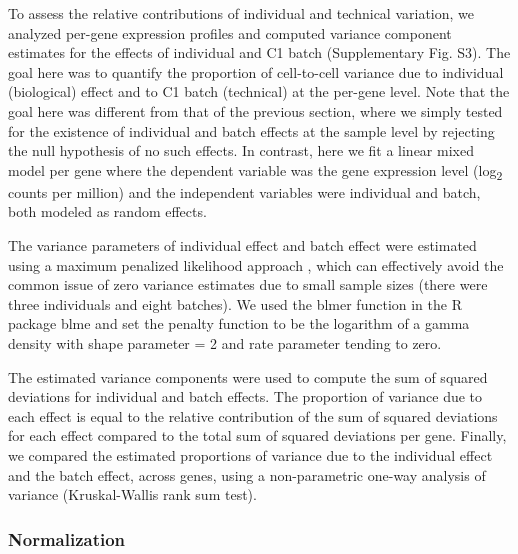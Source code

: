 To assess the relative contributions of individual and technical
variation, we analyzed per-gene expression profiles and computed
variance component estimates for the effects of individual and C1 batch
(Supplementary Fig. S3). The goal here was to quantify the proportion of
cell-to-cell variance due to individual (biological) effect and to C1
batch (technical) at the per-gene level. Note that the goal here was
different from that of the previous section, where we simply tested for
the existence of individual and batch effects at the sample level by
rejecting the null hypothesis of no such effects. In contrast, here we
fit a linear mixed model per gene where the dependent variable was the
gene expression level (log\textsubscript{2} counts per million) and the
independent variables were individual and batch, both modeled as random
effects.

The variance parameters of individual effect and batch effect were
estimated using a maximum penalized likelihood approach
\citep{Chung2013}, which can effectively avoid the common issue of zero
variance estimates due to small sample sizes (there were three
individuals and eight batches). We used the blmer function in the R
package blme and set the penalty function to be the logarithm of a gamma
density with shape parameter = 2 and rate parameter tending to zero.

The estimated variance components were used to compute the sum of
squared deviations for individual and batch effects. The proportion of
variance due to each effect is equal to the relative contribution of the
sum of squared deviations for each effect compared to the total sum of
squared deviations per gene. Finally, we compared the estimated
proportions of variance due to the individual effect and the batch
effect, across genes, using a non-parametric one-way analysis of
variance (Kruskal-Wallis rank sum test).

\subsubsection{Normalization}\label{normalization}


